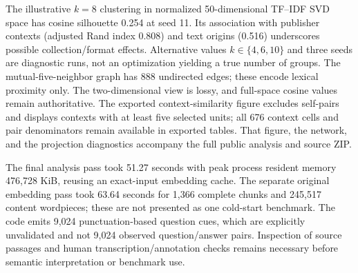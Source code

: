 The illustrative $k=8$ clustering in normalized 50-dimensional TF--IDF SVD space has cosine silhouette 0.254 at seed 11. Its association with publisher contexts (adjusted Rand index 0.808) and text origins (0.516) underscores possible collection/format effects. Alternative values $k\in\{4,6,10\}$ and three seeds are diagnostic runs, not an optimization yielding a true number of groups. The mutual-five-neighbor graph has 888 undirected edges; these encode lexical proximity only. The two-dimensional view is lossy, and full-space cosine values remain authoritative. The exported context-similarity figure excludes self-pairs and displays contexts with at least five selected units; all 676 context cells and pair denominators remain available in exported tables. That figure, the network, and the projection diagnostics accompany the full public analysis and source ZIP.


The final analysis pass took 51.27 seconds with peak process resident memory 476,728 KiB, reusing an exact-input embedding cache. The separate original embedding pass took 63.64 seconds for 1,366 complete chunks and 245,517 content wordpieces; these are not presented as one cold-start benchmark. The code emits 9,024 punctuation-based question cues, which are explicitly unvalidated and not 9,024 observed question/answer pairs. Inspection of source passages and human transcription/annotation checks remains necessary before semantic interpretation or benchmark use.
